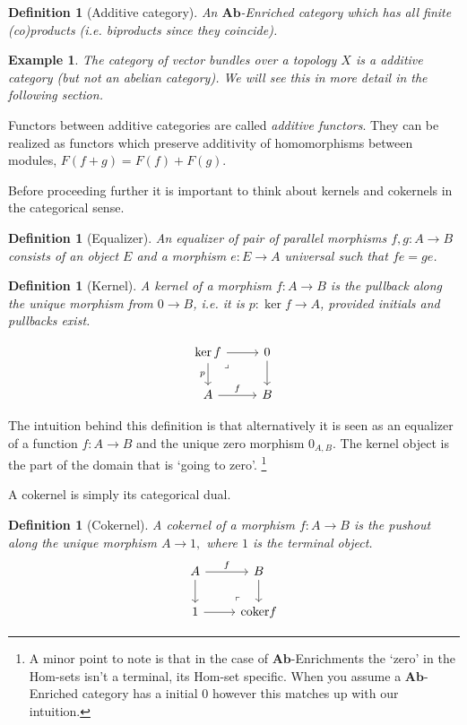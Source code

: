 \documentclass[12pt]{report}
\numberwithin{equation}{section}
\newtheorem{definition}[dummy]{Definition}
\newtheorem{example}[dummy]{Example}
\begin{document}
	
	\begin{definition}[Additive category]
		An $\mathbf{Ab}$-Enriched category which has all finite (co)products (i.e. biproducts since they coincide).
	\end{definition}
	
	\begin{example}
		The category of vector bundles over a topology $X$ is a additive category (but not an abelian category). We will see this in more detail in the following section.
	\end{example}
	Functors between additive categories are called \textit{additive functors}. They	 can be realized as functors which preserve additivity of homomorphisms between modules, $F(f+g)=F(f)+F(g).$
	
	Before proceeding further it is important to think about kernels and cokernels in the categorical sense.
	\begin{definition}[Equalizer]
		An equalizer of pair of parallel morphisms \( f,g:A \to B \) consists of an object \( E \) and a morphism \( e:E \to A \) universal such that \( fe=ge \).
	\end{definition}
	\begin{definition}[Kernel]
			A kernel of a morphism $f:A \to B$ is the pullback along the unique morphism from $0 \to B$, i.e. it is $p: \ker f \to A$, provided initials and pullbacks exist.
			
			\[\begin{tikzcd}
				{\ker f} & 0 \\
				A & B
				\arrow["f", from=2-1, to=2-2]
				\arrow[from=1-2, to=2-2]
				\arrow[from=1-1, to=1-2]
				\arrow["p"',from=1-1, to=2-1]
				\arrow["\lrcorner"{anchor=center, pos=0.125}, draw=none, from=1-1, to=2-2]
			\end{tikzcd}\]
	\end{definition}
	The intuition behind this definition is that alternatively it is seen as an equalizer of a function $f:A \to B$ and the unique zero morphism $0_{A,B}$. The kernel object is the part of the domain that is `going to zero'. \footnote{A minor point to note is that in the case of $\mathbf{Ab}$-Enrichments the `zero' in the Hom-sets isn't a terminal, its Hom-set specific. When you assume a $\mathbf{Ab}$-Enriched category has a initial 0 however this matches up with our intuition.}
		
	A cokernel is simply its categorical dual.
	\begin{definition}[Cokernel]
		A cokernel of a morphism $f:A \to B$ is the pushout along the unique morphism $A \to 1,$ where $1$ is the terminal object.
		\[\begin{tikzcd}
			A & B \\
			1 & {\mathrm{coker} f}
			\arrow["f", from=1-1, to=1-2]
			\arrow[from=1-1, to=2-1]
			\arrow[from=1-2, to=2-2]
			\arrow[from=2-1, to=2-2]
			\arrow["\lrcorner"{anchor=center, pos=0.125, rotate=180}, draw=none, from=2-2, to=1-1]
		\end{tikzcd}\]
	\end{definition}
	
\end{document}

